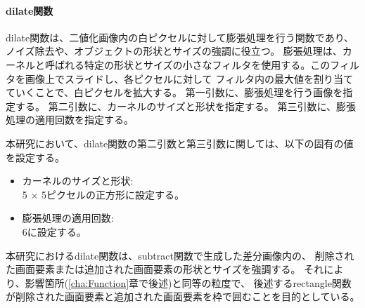 \paragraph{dilate関数}
dilate関数は、二値化画像内の白ピクセルに対して膨張処理を行う関数であり、ノイズ除去や、オブジェクトの形状とサイズの強調に役立つ。
膨張処理は、カーネルと呼ばれる特定の形状とサイズの小さなフィルタを使用する。このフィルタを画像上でスライドし、各ピクセルに対して
フィルタ内の最大値を割り当てていくことで、白ピクセルを拡大する。
第一引数に、膨張処理を行う画像を指定する。
第二引数に、カーネルのサイズと形状を指定する。
第三引数に、膨張処理の適用回数を指定する。
\par
本研究において、dilate関数の第二引数と第三引数に関しては、以下の固有の値を設定する。
\begin{itemize}
      \setlength{\itemsep}{0pt}
            \setlength{\parsep}{0pt}
      \item カーネルのサイズと形状:\\
            5 $\times$ 5ピクセルの正方形に設定する。
      \item 膨張処理の適用回数:\\
            $6$に設定する。
\end{itemize}
\par
本研究におけるdilate関数は、subtract関数で生成した差分画像内の、
削除された画面要素または追加された画面要素の形状とサイズを強調する。
それにより、影響箇所(\ref{cha:Function}章で後述)と同等の粒度で、
後述するrectangle関数が削除された画面要素と追加された画面要素を枠で囲むことを目的としている。
